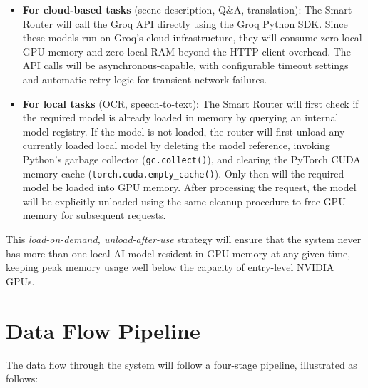 \begin{itemize}[leftmargin=1.5cm]
\item \textbf{For cloud-based tasks} (scene description, Q\&A, translation): The Smart Router will call the Groq API directly using the Groq Python SDK. Since these models run on Groq's cloud infrastructure, they will consume zero local GPU memory and zero local RAM beyond the HTTP client overhead. The API calls will be asynchronous-capable, with configurable timeout settings and automatic retry logic for transient network failures.

\item \textbf{For local tasks} (OCR, speech-to-text): The Smart Router will first check if the required model is already loaded in memory by querying an internal model registry. If the model is not loaded, the router will first unload any currently loaded local model by deleting the model reference, invoking Python's garbage collector (\texttt{gc.collect()}), and clearing the PyTorch CUDA memory cache (\texttt{torch.cuda.empty\_cache()}). Only then will the required model be loaded into GPU memory. After processing the request, the model will be explicitly unloaded using the same cleanup procedure to free GPU memory for subsequent requests.
\end{itemize}

This \textit{load-on-demand, unload-after-use} strategy will ensure that the system never has more than one local AI model resident in GPU memory at any given time, keeping peak memory usage well below the capacity of entry-level NVIDIA GPUs.

\section{Data Flow Pipeline}
The data flow through the system will follow a four-stage pipeline, illustrated as follows:

